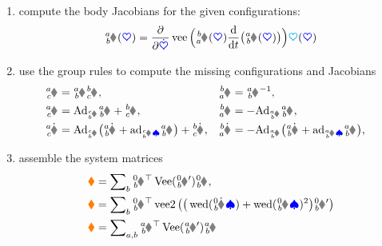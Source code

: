 \begin{enumerate}
\item compute the body Jacobians for the given configurations:
\begin{align}\label{eq:RBSAlgoJacobian}
 \bodyJac{\BidxI}{\BidxII}(\sysCoord) = \pdiff{\sysCoordd} \veeOp\Big( \bodyHomoCoord{\BidxII}{\BidxI}(\sysCoord) \diff{t} \big(\bodyHomoCoord{\BidxI}{\BidxII}(\sysCoord) \big) \Big) \kinMat(\sysCoord)
\end{align}
\item use the group rules to compute the missing configurations and Jacobians
\begin{subequations}
\begin{align}
 \bodyHomoCoord{\BidxI}{\BidxIII} &= \bodyHomoCoord{\BidxI}{\BidxII} \bodyHomoCoord{\BidxII}{\BidxIII},&
 \bodyHomoCoord{\BidxII}{\BidxI} &= \bodyHomoCoord{\BidxI}{\BidxII}^{-1},&
\\
 \bodyJac{\BidxI}{\BidxIII} &= \Ad{\bodyHomoCoord{\BidxIII}{\BidxII}} \bodyJac{\BidxI}{\BidxII} + \bodyJac{\BidxII}{\BidxIII},&
 \bodyJac{\BidxII}{\BidxI} &= -\Ad{\bodyHomoCoord{\BidxI}{\BidxII}} \bodyJac{\BidxI}{\BidxII},&
\\
 \bodyJacd{\BidxI}{\BidxIII} &= \Ad{\bodyHomoCoord{\BidxIII}{\BidxII}} \big(\bodyJacd{\BidxI}{\BidxII} + \ad{\bodyJac{\BidxIII}{\BidxII}\sysVel} \bodyJac{\BidxI}{\BidxII} \big) + \bodyJacd{\BidxII}{\BidxIII},&
 \bodyJacd{\BidxII}{\BidxI} &= -\Ad{\bodyHomoCoord{\BidxI}{\BidxII}} \big(\bodyJacd{\BidxI}{\BidxII} + \ad{\bodyJac{\BidxI}{\BidxII}\sysVel} \bodyJac{\BidxI}{\BidxII} \big),&
\end{align}
\end{subequations} 
\item assemble the system matrices
\begin{subequations}
\begin{align}
 \sysInertiaMat &= \sumBodies \bodyJac{0}{\BidxII}^\top \veeMatOp(\bodyInertiaMatp{0}{\BidxII}) \bodyJac{0}{\BidxII},
\\
 \gyroForce &= \sumBodies \bodyJac{0}{\BidxII}^\top \veeTwoOp \big(\big(\wedOp(\bodyJacd{0}{\BidxII} \sysVel) + \wedOp(\bodyJac{0}{\BidxII} \sysVel)^2 \big) \bodyInertiaMatp{0}{\BidxII} \big) 
\\
 \sysDissMat &= \sumBodiesAB \bodyJac{\BidxI}{\BidxII}^\top \veeMatOp(\bodyDissMatp{\BidxI}{\BidxII}) \bodyJac{\BidxI}{\BidxII}

\end{align}
\end{subequations}
\end{enumerate}
